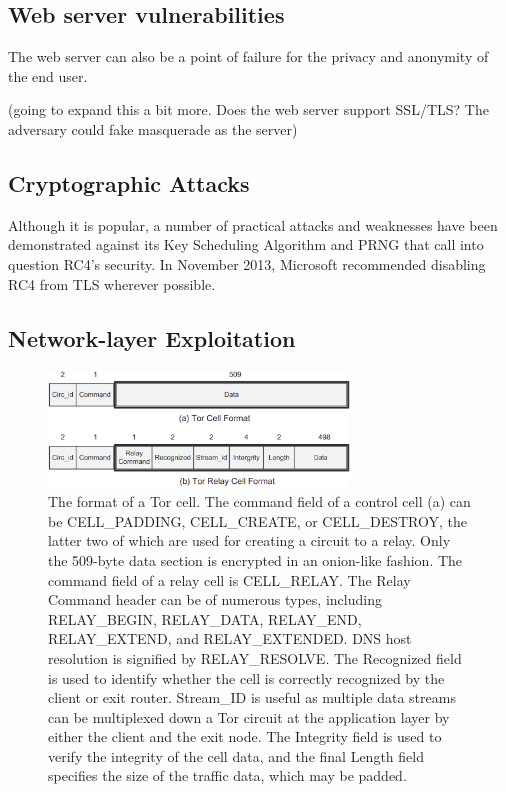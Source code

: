 \documentclass[journal]{IEEEtran}
\begin{document}
\subsection{Web server vulnerabilities}

The web server can also be a point of failure for the privacy and anonymity of the end user.

(going to expand this a bit more. Does the web server support SSL/TLS? The adversary could fake masquerade as the server)

\subsection{Cryptographic Attacks}

Although it is popular, a number of practical attacks and weaknesses have been demonstrated against its Key Scheduling Algorithm and PRNG that call into question RC4's security. In November 2013, Microsoft recommended disabling RC4 from TLS wherever possible.

\subsection{Network-layer Exploitation}

\begin{figure}[htbp]
\centering
\begin{minipage}{8 cm}
    \includegraphics[width=80mm]{resources/tor-cell-format.png}
    \caption{The format of a Tor cell. The command field of a control cell (a) can be CELL\_PADDING, CELL\_CREATE, or CELL\_DESTROY, the latter two of which are used for creating a circuit to a relay. Only the 509-byte data section is encrypted in an onion-like fashion. \newline\hspace*{2em} The command field of a relay cell is CELL\_RELAY. The Relay Command header can be of numerous types, including RELAY\_BEGIN, RELAY\_DATA, RELAY\_END, RELAY\_EXTEND, and RELAY\_EXTENDED. DNS host resolution is signified by RELAY\_RESOLVE. The Recognized field is used to identify whether the cell is correctly recognized by the client or exit router. Stream\_ID is useful as multiple data streams can be multiplexed down a Tor circuit at the application layer by either the client and the exit node. The Integrity field is used to verify the integrity of the cell data, and the final Length field specifies the size of the traffic data, which may be padded.}
\end{minipage}
\end{figure}
\end{document}

